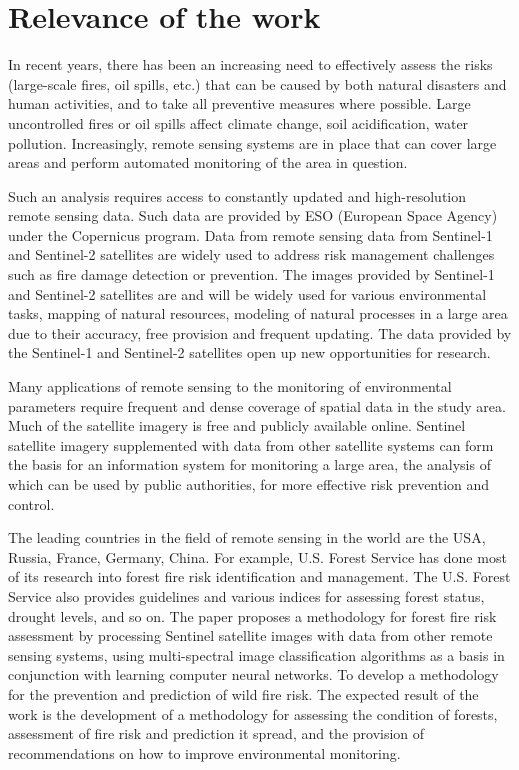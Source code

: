 \section{Relevance of the work}
	In recent years, there has been an increasing need to effectively assess the risks (large-scale fires, oil spills, etc.) that can be caused by both natural disasters and human activities, and to take all preventive measures where possible. Large uncontrolled fires or oil spills affect climate change, soil acidification, water pollution. Increasingly, remote sensing systems are in place that can cover large areas and perform automated monitoring of the area in question.
	
	Such an analysis requires access to constantly updated and high-resolution remote sensing data. Such data are provided by ESO (European Space Agency) under the Copernicus program. Data from remote sensing data from Sentinel-1 and Sentinel-2 satellites are widely used to address risk management challenges such as fire damage detection or prevention. The images provided by Sentinel-1 and Sentinel-2 satellites are and will be widely used for various environmental tasks, mapping of natural resources, modeling of natural processes in a large area due to their accuracy, free provision and frequent updating. The data provided by the Sentinel-1 and Sentinel-2 satellites open up new opportunities for research.
	
	Many applications of remote sensing to the monitoring of environmental parameters require frequent and dense coverage of spatial data in the study area. Much of the satellite imagery is free and publicly available online. Sentinel satellite imagery supplemented with data from other satellite systems can form the basis for an information system for monitoring a large area, the analysis of which can be used by public authorities, for more effective risk prevention and control.
	
	The leading countries in the field of remote sensing in the world are the USA, Russia, France, Germany, China. For example, U.S. Forest Service has done most of its research into forest fire risk identification and management. The U.S. Forest Service also provides guidelines and various indices for assessing forest status, drought levels, and so on.
	The paper proposes a methodology for forest fire risk assessment by processing Sentinel satellite images with data from other remote sensing systems, using multi-spectral image classification algorithms as a basis in conjunction with learning computer neural networks. To develop a methodology for the prevention and prediction of wild fire risk.
	The expected result of the work is the development of a methodology for assessing the condition of forests, assessment of fire risk and prediction it spread, and the provision of recommendations on how to improve environmental monitoring.

